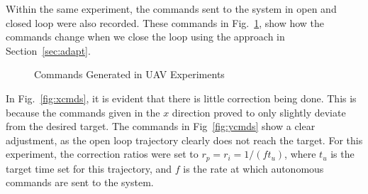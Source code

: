 \documentclass[letterpaper, 10 pt, conference]{ieeeconf}  %
\begin{document}
Within the same experiment, the commands sent to the system in open and closed loop were also recorded. These commands in Fig.~\ref{fig:expcmds}, show how the commands change when we close the loop using the approach in Section~\ref{sec:adapt}. 

\begin{figure}[h]
	\centering
	\caption{Commands Generated in UAV Experiments}
	\label{fig:expcmds}
\end{figure}

In Fig.~\ref{fig:xcmds}, it is evident that there is little correction being done. This is because the commands given in the $x$ direction proved to only slightly deviate from the desired target. The commands in Fig~\ref{fig:ycmds} show a clear adjustment, as the open loop trajectory clearly does not reach the target. For this experiment, the correction ratios were set to $r_p = r_i = 1/(ft_u)$, where $t_u$ is the target time set for this trajectory, and $f$ is the rate at which autonomous commands are sent to the system. 
\end{document}
